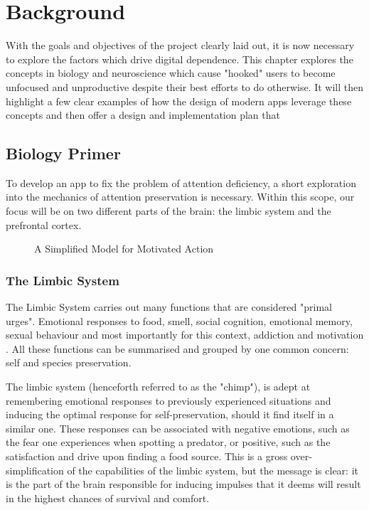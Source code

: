 \chapter{Background}
\label{ch:background}
With the goals and objectives of the project clearly laid out, it is now necessary to explore the factors which drive digital dependence. This chapter explores the concepts in biology and neuroscience which cause "hooked" users to become unfocused and unproductive despite their best efforts to do otherwise. It will then highlight a few clear examples of how the design of modern apps leverage these concepts and then offer a design and implementation plan that

\section{Biology Primer}
To develop an app to fix the problem of attention deficiency, a short exploration into the mechanics of attention preservation is necessary.
Within this scope, our focus will be on two different parts of the brain: the limbic system and the prefrontal cortex.

\begin{figure}[h]
    \begin{center}
        \fbox{\rule{0pt}{1.2in} \rule{0.99\linewidth}{0pt}}
    \end{center}
    \caption{A Simplified Model for Motivated Action}
    \label{fig:1}
\end{figure}

\subsection{The Limbic System}
The Limbic System carries out many functions that are considered "primal urges". Emotional responses to food, smell, social cognition, emotional memory, sexual behaviour and most importantly for this context, addiction and motivation \cite{rajmohan2007limbic}. All these functions can be summarised and grouped by one common concern: self and species preservation.

The limbic system (henceforth referred to as the "chimp"), is adept at remembering emotional responses to previously experienced situations and inducing the optimal response for self-preservation, should it find itself in a similar one. These responses can be associated with negative emotions, such as the fear one experiences when spotting a predator, or positive, such as the satisfaction and drive upon finding a food source. This is a gross over-simplification of the capabilities of the limbic system, but the message is clear: it is the part of the brain responsible for inducing impulses that it deems will result in the highest chances of survival and comfort.

